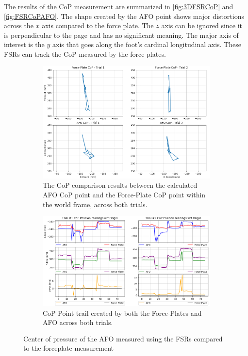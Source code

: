The results of the CoP measurement are summarized in \autoref{fig:3DFSRCoP} and \autoref{fig:FSRCoPAFO}. The shape created by the AFO point shows major distortions across the $x$ axis compared to the force plate. The $z$ axis can be ignored since it is perpendicular to the page and has no significant meaning. The major axis of interest is the $y$ axis that goes along the foot's cardinal longitudinal axis. These FSRs can track the CoP measured by the force plates. 


\begin{figure}[h!]
    \centering
    \begin{subfigure}{0.5\linewidth}
        \captionsetup{justification=centering}
        \centerline{ \includegraphics[scale=0.35]{images/mech_design/SoleSensorV3_CoPComparison_2D_XYplane.png}}
        \caption[CoP comparison]{The CoP comparison results between the calculated AFO CoP point and the Force-Plate CoP point within the world frame, across both trials.}
        \label{fig:3DFSRCoP}
    \end{subfigure}%
    \vspace{1cm}
    \begin{subfigure}{.5\linewidth}
        \captionsetup{justification=centering}
        \centerline{\includegraphics[scale=0.35]{images/mech_design/SoleSensorV3_CoPComparison_BothTrials.png}}
        \caption[CoP Point Trail ]{CoP Point trail created by both the Force-Plates and AFO across both trials. }
        \label{fig:FSRCoPAFO}
    \end{subfigure}%
    \caption[Center of Pressure of the AFO]{Center of pressure of the AFO measured using the FSRs compared to the forceplate measurement \cite{Michaels2020}}
    \label{fig:CoPAFO}
\end{figure}


